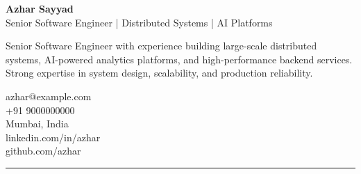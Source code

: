 \documentclass[11pt,a4paper]{article}
\begin{document}
\noindent
\begin{minipage}[t]{0.67\textwidth}
{\Huge\bfseries Azhar Sayyad} \\[4pt]
{\color{accent}\large Senior Software Engineer | Distributed Systems | AI Platforms}

\vspace{6pt}

Senior Software Engineer with experience building large-scale distributed systems,
AI-powered analytics platforms, and high-performance backend services.
Strong expertise in system design, scalability, and production reliability.

\end{minipage}
\hfill
\begin{minipage}[t]{0.30\textwidth}
\raggedleft
azhar@example.com \faEnvelope\\[6pt]
+91 9000000000 \faPhone\\[6pt]
Mumbai, India \faMapMarker*\\[6pt]
linkedin.com/in/azhar \faLinkedin\\[6pt]
github.com/azhar \faGithub
\end{minipage}

\vspace{10pt}
\hrule
\vspace{10pt}
\end{document}
